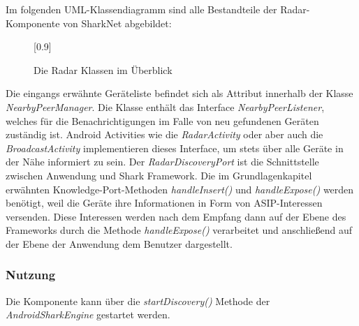 Im folgenden UML-Klassendiagramm sind alle Bestandteile der Radar-Komponente von SharkNet abgebildet:
\begin{figure}[H]
	\centering
	\scalebox{1}[0.9]{}
	\caption{Die Radar Klassen im Überblick}
	\label{fig:radarhAll}
\end{figure}
Die eingangs erwähnte Geräteliste befindet sich als Attribut innerhalb der Klasse \textit{Nearby\-Peer\-Manager}. Die Klasse enthält das Interface \textit{NearbyPeerListener}, welches für die Benachrichtigungen im Falle von neu gefundenen Geräten zuständig ist. Android Activities wie die \textit{RadarActivity} oder aber auch die \textit{BroadcastActivity} implementieren dieses Interface, um stets über alle Geräte in der Nähe informiert zu sein. Der \textit{RadarDiscoveryPort} ist die Schnittstelle zwischen Anwendung und Shark Framework. Die im Grundlagenkapitel erwähnten Knowledge-Port-Methoden \textit{handleInsert()} und \textit{handleExpose()} werden benötigt, weil die Geräte ihre Informationen in Form von ASIP-Interessen versenden. Diese Interessen werden nach dem Empfang dann auf der Ebene des Frameworks durch die Methode \textit{handleExpose()} verarbeitet und anschließend auf der Ebene der Anwendung dem Benutzer dargestellt.

\subsubsection{Nutzung}
Die Komponente kann über die \textit{startDiscovery()} Methode der \textit{AndroidSharkEngine} gestartet werden.

